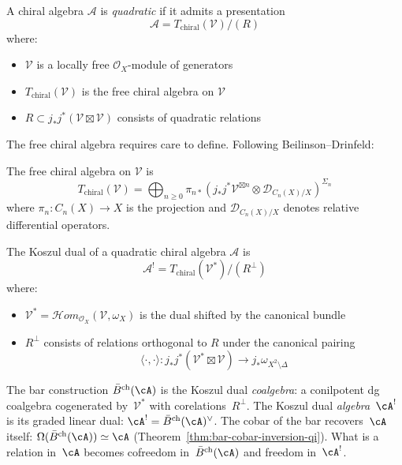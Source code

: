 \begin{definition}
A chiral algebra $\mathcal{A}$ is \emph{quadratic} if it admits a presentation
\[
\mathcal{A} = T_{\text{chiral}}(\mathcal{V})/(R)
\]
where:
\begin{itemize}
\item $\mathcal{V}$ is a locally free $\mathcal{O}_X$-module of generators
\item $T_{\text{chiral}}(\mathcal{V})$ is the free chiral algebra on $\mathcal{V}$
\item $R \subset j_*j^*(\mathcal{V} \boxtimes \mathcal{V})$ consists of quadratic relations
\end{itemize}
\end{definition}

The free chiral algebra requires care to define. Following Beilinson--Drinfeld:

\begin{definition}
The free chiral algebra on $\mathcal{V}$ is
\[
T_{\text{chiral}}(\mathcal{V}) = \bigoplus_{n \geq 0} \pi_{n*}\left(j_*j^*\mathcal{V}^{\boxtimes n} \otimes \mathcal{D}_{C_n(X)/X}\right)^{\Sigma_n}
\]
where $\pi_n: C_n(X) \to X$ is the projection and $\mathcal{D}_{C_n(X)/X}$ denotes relative differential operators.
\end{definition}

\begin{definition}
The Koszul dual of a quadratic chiral algebra $\mathcal{A}$ is
\[
\mathcal{A}^! = T_{\text{chiral}}(\mathcal{V}^*)/(R^{\perp})
\]
where:
\begin{itemize}
\item $\mathcal{V}^* = \mathcal{H}om_{\mathcal{O}_X}(\mathcal{V}, \omega_X)$ is the dual shifted by the canonical bundle
\item $R^{\perp}$ consists of relations orthogonal to $R$ under the canonical pairing
\[
\langle \cdot, \cdot \rangle: j_*j^*(\mathcal{V}^* \boxtimes \mathcal{V}) \to j_*\omega_{X^2 \setminus \Delta}
\]
\end{itemize}
\end{definition}

\begin{remark}\label{rem:koszul-dual-meaning}
The bar construction $\bar{B}^{\mathrm{ch}}(\cA)$ is the Koszul dual \emph{coalgebra}: a conilpotent dg coalgebra cogenerated by~$\mathcal{V}^*$ with corelations~$R^{\perp}$.  The Koszul dual \emph{algebra}~$\cA^!$ is its graded linear dual: $\cA^! = \bar{B}^{\mathrm{ch}}(\cA)^\vee$.  The cobar of the bar recovers~$\cA$ itself: $\Omega(\bar{B}^{\mathrm{ch}}(\cA)) \simeq \cA$ (Theorem~\ref{thm:bar-cobar-inversion-qi}).  What is a relation in~$\cA$ becomes cofreedom in~$\bar{B}^{\mathrm{ch}}(\cA)$ and freedom in~$\cA^!$.
\end{remark}

